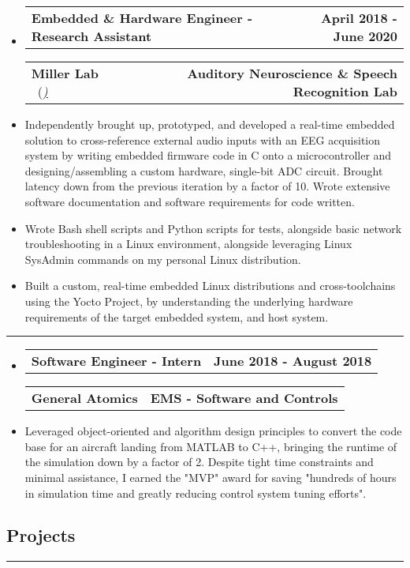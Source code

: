 \documentclass[10pt,letterpaper]{article}
\makeatletter
\newcommand{\header}[2]
{
	\begin{tabular*}{\linewidth}{l @{\extracolsep{\fill}} r}
		\hspace{-27pt} #1 & #2 \\
	\end{tabular*}
}
\newcommand{\sectionbreak}
{
	\vspace{-1.2em}
	\rule{\textwidth}{1.7pt}
	\vspace{-1.7em}
}
\makeatother
\begin{document}
\begin{itemize}
	\item[]
		\header
			{\textbf{Embedded \& Hardware Engineer - Research Assistant}} 
			{\textbf{April 2018 - June 2020}}
		\header
		{\textbf{Miller Lab} \ (\href{https://millerlab.faculty.ucdavis.edu}{\small \emph{\underline{\smash{millerlab.faculty.ucdavis.edu})}}} }
			{\textbf{Auditory Neuroscience \& Speech Recognition Lab}} 
		\item
			Independently brought up, prototyped, and developed a real-time embedded solution to cross-reference external audio inputs with an EEG acquisition system
			by writing embedded firmware code in C onto a microcontroller and designing/assembling a custom hardware, single-bit ADC circuit. Brought latency down from the previous iteration by a factor of 10. 
			Wrote extensive software documentation and software requirements for code written.
		\item 
			Wrote Bash shell scripts and Python scripts for tests, alongside basic network troubleshooting in a Linux environment, alongside leveraging Linux SysAdmin commands on my personal Linux distribution.
		\item 
			Built a custom, real-time embedded Linux distributions and cross-toolchains using the Yocto Project, by understanding the underlying hardware requirements of the target embedded system, and host system.


\end{itemize}

\hrule

\begin{itemize}
	\item[]
		\header
			{\textbf{Software Engineer - Intern}} 
			{\textbf{June 2018 - August 2018}}
		\header
			{\textbf{General Atomics}}
			{\textbf{EMS - Software and Controls}} 
		\item
			Leveraged object-oriented and algorithm design principles to convert the code base for an aircraft landing from MATLAB to C++, bringing the runtime of the simulation down 
			by a factor of 2. Despite tight time constraints and minimal assistance, I earned the "MVP" award for saving "hundreds of hours in simulation time and greatly reducing control system tuning efforts".




\end{itemize}

\vspace{-1.5em}

\subsection*{Projects}
\sectionbreak
\end{document}
